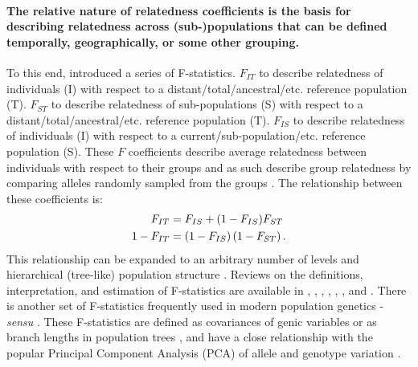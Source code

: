 \paragraph{The relative nature of relatedness coefficients is the basis
for describing relatedness across (sub-)populations that can be defined
temporally, geographically, or some other grouping.}
%
To this end, \cite{wright1949genetical} introduced a series of
F-statistics.
%
$F_{IT}$ to describe relatedness of individuals (I) with respect to
a distant/total/ancestral/etc. reference population (T).
%
$F_{ST}$ to describe relatedness of sub-populations (S) with respect to
a distant/total/ancestral/etc. reference population (T).
%
$F_{IS}$ to describe relatedness of individuals (I) with respect to
a current/sub-population/etc. reference population (S).
%
These $F$ coefficients describe average relatedness between individuals
with respect to their groups and as such describe group relatedness
by comparing alleles randomly sampled from the groups
\cite{wright1949genetical, jacquard1975inbreeding, cockerham1976group}.
%
The relationship between these coefficients is:
%
\begin{align} \label{eqn:fst}
      F_{IT} & = F_{IS} + (1 - F_{IS}) F_{ST}\\
  1 - F_{IT} & = \left(1 - F_{IS}\right)\left(1 - F_{ST}\right). \notag
\end{align}
%
This relationship can be expanded to
an arbitrary number of levels \citep{ochoa2021estimating} and
hierarchical (tree-like) population structure \citep{maryhuard2023fast}.
%
Reviews on the definitions, interpretation, and
estimation of F-statistics are available in
\cite{cockerham1969variance}, \cite{cockerham1973analyses},
\cite{holsinger2009genetics}, \cite{bhatia2013estimating},
\cite{garciabaccino2017metafounders}, \cite{ochoa2021estimating},
and \cite{maryhuard2023fast}.
%
There is another set of F-statistics frequently used in modern population
genetics - \textit{sensu} \cite{patterson2012ancient}.
%
These F-statistics are defined as covariances of genic variables
or as branch lengths in population trees \citep{peter2016admixture},
and have a close relationship with the popular Principal Component
Analysis (PCA) of allele and genotype variation \citep{peter2022geometric}.

